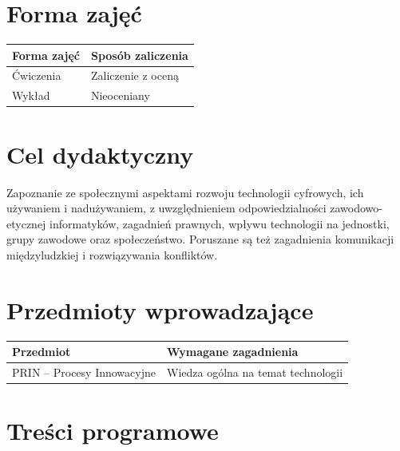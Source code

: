 \documentclass[12pt, a4paper]{article}
\begin{document}
\section{Forma zajęć}

\begin{tabular}{ll}
  \hline
  \textbf{Forma zajęć} & \textbf{Sposób zaliczenia} \\
  \hline
  Ćwiczenia & Zaliczenie z oceną \\
  Wykład & Nieoceniany \\
  \hline
\end{tabular}

\section{Cel dydaktyczny}

Zapoznanie ze społecznymi aspektami rozwoju technologii cyfrowych, ich używaniem i nadużywaniem, z uwzględnieniem odpowiedzialności zawodowo-etycznej informatyków, zagadnień prawnych, wpływu technologii na jednostki, grupy zawodowe oraz społeczeństwo. Poruszane są też zagadnienia komunikacji międzyludzkiej i rozwiązywania konfliktów.

\section{Przedmioty wprowadzające}

\begin{tabularx}{\textwidth}{lX}
  \hline
  \textbf{Przedmiot} & \textbf{Wymagane zagadnienia} \\
  \hline
  PRIN – Procesy Innowacyjne & Wiedza ogólna na temat technologii \\
  \hline
\end{tabularx}

\section{Treści programowe}
\end{document}
